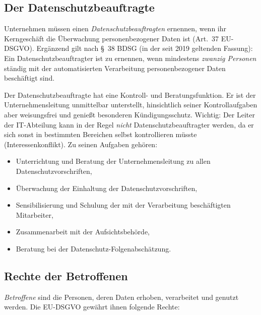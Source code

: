 \documentclass[11pt, a4paper]{article}
\begin{document}
\subsection{Der Datenschutzbeauftragte}

Unternehmen müssen einen \emph{Datenschutzbeauftragten} ernennen, wenn ihr Kerngeschäft
die Überwachung personenbezogener Daten ist (Art.~37 EU-DSGVO). Ergänzend gilt nach
\S~38 BDSG (in der seit 2019 geltenden Fassung): Ein Datenschutzbeauftragter ist zu
ernennen, wenn mindestens \emph{zwanzig Personen} ständig mit der automatisierten
Verarbeitung personenbezogener Daten beschäftigt sind.

Der Datenschutzbeauftragte hat eine Kontroll- und Beratungsfunktion. Er ist der
Unternehmensleitung unmittelbar unterstellt, hinsichtlich seiner Kontrollaufgaben aber
weisungsfrei und genießt besonderen Kündigungsschutz. Wichtig: Der Leiter der
IT-Abteilung kann in der Regel \emph{nicht} Datenschutzbeauftragter werden, da er sich
sonst in bestimmten Bereichen selbst kontrollieren müsste (Interessenkonflikt). Zu
seinen Aufgaben gehören:

\begin{itemize}
  \item Unterrichtung und Beratung der Unternehmensleitung zu allen Datenschutzvorschriften,
  \item Überwachung der Einhaltung der Datenschutzvorschriften,
  \item Sensibilisierung und Schulung der mit der Verarbeitung beschäftigten Mitarbeiter,
  \item Zusammenarbeit mit der Aufsichtsbehörde,
  \item Beratung bei der Datenschutz-Folgenabschätzung.
\end{itemize}

\subsection{Rechte der Betroffenen}

\emph{Betroffene} sind die Personen, deren Daten erhoben, verarbeitet und genutzt werden.
Die EU-DSGVO gewährt ihnen folgende Rechte:
\end{document}
